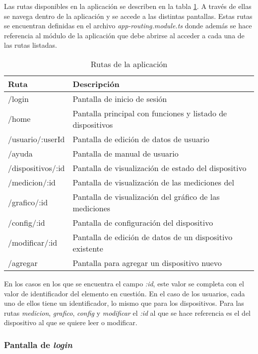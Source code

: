 Las rutas disponibles en la aplicación se describen en la tabla \ref{tab:rutas}. A través de ellas se navega dentro de la aplicación y se accede a las distintas pantallas. Estas rutas se encuentran definidas en el archivo \textit{app-routing.module.ts} donde además se hace referencia al módulo de la aplicación que debe abrirse al acceder a cada una de las rutas listadas.

\begin{table}[h]
\centering
\caption[Rutas]{Rutas de la aplicación}
\begin{tabular}{l l}
\toprule
\textbf{Ruta} 			& \textbf{Descripción}\\
\midrule
/login					& Pantalla de inicio de sesión\\
/home					& Pantalla principal con funciones y listado de dispositivos\\
/usuario/:userId			& Pantalla de edición de datos de usuario\\
/ayuda					& Pantalla de manual de usuario\\
/dispositivos/:id		& Pantalla de visualización de estado del dispositivo\\
/medicion/:id			& Pantalla de visualización de las mediciones del\\
/grafico/:id				& Pantalla de visualización del gráfico de las mediciones\\
/config/:id				& Pantalla de configuración del dispositivo\\
/modificar/:id			& Pantalla de edición de datos de un dispositivo existente\\
/agregar					& Pantalla para agregar un dispositivo nuevo\\
\bottomrule
\hline
\end{tabular}
\label{tab:rutas}
\end{table}

En los casos en los que se encuentra el campo \textit{:id}, este valor se completa con el valor de identificador del elemento en cuestión. En el caso de los usuarios, cada uno de ellos tiene un identificador, lo mismo que para los dispositivos. Para las rutas \textit{medicion}, \textit{grafico}, \textit{config} y \textit{modificar} el \textit{:id} al que se hace referencia es el del dispositivo al que se quiere leer o modificar.

\subsubsection{Pantalla de \textit{login}}

